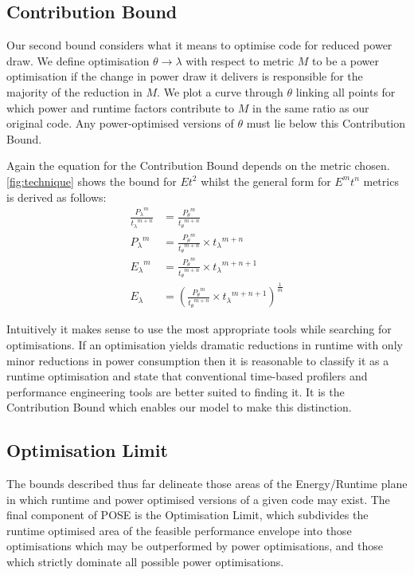 \subsection{Contribution Bound}
Our second bound considers what it means to optimise code for reduced power draw. 
We define optimisation $\theta \to \lambda$ with respect to metric $M$ to be a power optimisation if the change in power draw it delivers is responsible for the majority of the reduction in $M$. We plot a curve through $\theta$ linking all points for which power and runtime factors contribute to $M$ in the same ratio as our original code. Any power-optimised versions of $\theta$ must lie below this Contribution Bound.

Again the equation for the Contribution Bound depends on the metric chosen. 
\autoref{fig:technique} shows the bound for $Et^2$ whilst the general form for $E^mt^n$ metrics is derived as follows:
\begin{align}
\frac{{P_{\lambda}}^m}{{t_{\lambda}}^{m+n}} &= \frac{{P_{\theta}}^m}{{t_{\theta}}^{m+n}} \nonumber \\
 {P_{\lambda}}^m &= \frac{{P_{\theta}}^m}{{t_{\theta}}^{m+n}} \times {t_\lambda}^{m+n} \nonumber \\ 
 {E_{\lambda}}^m &= \frac{{P_{\theta}}^m}{{t_{\theta}}^{m+n}} \times {t_\lambda}^{m+n+1} \nonumber \\ 
  E_{\lambda} &= (\frac{{P_{\theta}}^m}{{t_{\theta}}^{m+n}} \times {t_\lambda}^{m+n+1})^{\frac{1}{m}} 
\end{align}

Intuitively it makes sense to use the most appropriate tools while searching for optimisations.  If an optimisation yields dramatic reductions in runtime with only minor reductions in power consumption then it is reasonable to classify it as a runtime optimisation and state that conventional time-based profilers and performance engineering tools are better suited to finding it. It is the Contribution Bound which enables our model to make this distinction.
\subsection{Optimisation Limit}
The bounds described thus far delineate those areas of the Energy/Runtime plane in which runtime and power optimised versions of a given code may exist.
The final component of POSE is the Optimisation Limit, which subdivides the runtime optimised area of the feasible performance envelope into those optimisations which may be outperformed by power optimisations, and those which strictly dominate all possible power optimisations.

